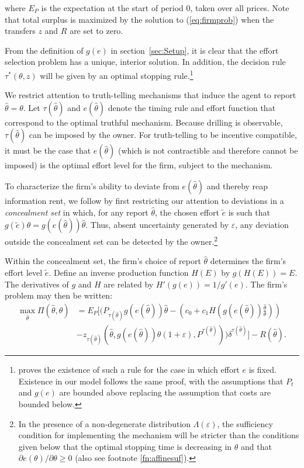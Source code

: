 \documentclass[12pt]{article}
\begin{document}
where $E_P$ is the expectation at the start of period 0, taken over all prices. Note that total surplus is maximized by the solution to (\ref{eq:firmprob}) when the transfers $z$ and $R$ are set to zero.

From the definition of $g(e)$ in section~\ref{sec:Setup}, it is clear that the effort selection problem has a unique, interior solution. In addition, the decision rule $\tau^*(\theta,z)$ will be given by an optimal stopping rule.\footnote{\citet{bib:board} proves the existence of such a rule for the case in which effort $e$ is fixed. Existence in our model follows the same proof, with the assumptions that $P_t$ and $g(e)$ are bounded above replacing the \citet{bib:board} assumption that costs are bounded below.}

We restrict attention to truth-telling mechanisms that induce the agent to report $\hat{\theta}=\theta$. Let $\tau(\hat{\theta})$ and $e(\hat{\theta})$ denote the timing rule and effort function that correspond to the optimal truthful mechanism. Because drilling is observable, $\tau(\hat{\theta})$ can be imposed by the owner. For truth-telling to be incentive compatible, it must be the case that $e(\hat{\theta})$ (which is not contractible and therefore cannot be imposed) is the optimal effort level for the firm, subject to the mechanism.

To characterize the firm's ability to deviate from $e(\hat{\theta})$ and thereby reap information rent, we follow \citet{bib:laffonttirole1986} by first restricting our attention to deviations in a {\it concealment set} in which, for any report $\hat{\theta}$, the chosen effort $\tilde{e}$ is such that $g(\tilde{e})\theta=g(e(\hat{\theta}))\hat{\theta}$. Thus, absent uncertainty generated by $\varepsilon$, any deviation outside the concealment set can be detected by the owner.\footnote{In the presence of a non-degenerate distribution $\Lambda(\varepsilon)$, the sufficiency condition for implementing the mechanism will be stricter than the conditions given below that the optimal stopping time is decreasing in $\theta$ and that $\partial e(\theta)/\partial\theta\geq0$ (also see footnote \ref{fn:affinesuf}).}

Within the concealment set, the firm's choice of report $\hat{\theta}$ determines the firm's effort level $\tilde{e}$. Define an inverse production function $H(E)$ by $g(H(E))=E$. The derivatives of $g$ and $H$ are related by $H'(g(e))=1/g'(e)$. The firm's problem may then be written:
\begin{align}
\max_{\hat{\theta}}\Pi(\hat{\theta},\theta)&=E_P[(P_{\tau(\hat{\theta})} g(e(\hat{\theta}))\hat{\theta}-(c_0+c_1H(g(e(\hat{\theta}))\frac{\hat{\theta}}{\theta})) \nonumber \\
&-z_{\tau(\hat{\theta})}(\hat{\theta},g(e(\hat{\theta}))\hat{\theta}(1+\varepsilon),P^{\tau(\hat{\theta})}))\delta^{\tau(\hat{\theta})}]-R(\hat{\theta}). \label{eq:firmrestricted}
\end{align}
\end{document}

